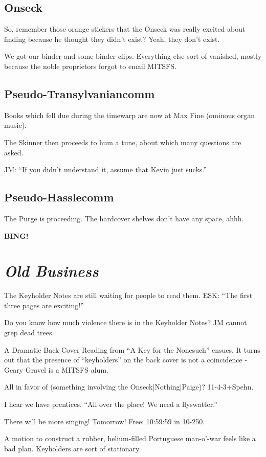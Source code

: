 \documentclass[10pt]{article}
\newcommand{\bing}{{\bf BING!} }
\newcommand{\goto}[1]{\bing \vskip 12pt \section*{{\em{#1}}}}
\begin{document}
\subsection*{Onseck}

So, remember those orange stickers that the Onseck was really excited about finding
because he thought they didn't exist?  Yeah, they don't exist. 

We got our binder and some binder clips.  Everything else sort of vanished, mostly
because the noble proprietors forgot to email MITSFS.

\subsection*{Pseudo-Transylvaniancomm}

Books which fell due during the timewarp are now at Max Fine (ominous organ music).

The Skinner then proceeds to hum a tune, about which many questions are asked.

JM: ``If you didn't understand it, assume that Kevin just sucks.''

\subsection*{Pseudo-Hasslecomm}

The Purge is proceeding.  The hardcover shelves don't have any space, ahhh.

\goto{Old Business}

The Keyholder Notes are still waiting for people to read them.  ESK: ``The first three pages are
exciting!''

Do you know how much violence there is in the Keyholder Notes?  JM cannot grep dead trees.

A Dramatic Back Cover Reading from ``A Key for the Nonesuch'' ensues.  It turns out that the presence
of ``keyholders'' on the back cover is not a coincidence - Geary Gravel is a MITSFS alum. 

All in favor of (something involving the Onseck|Nothing|Paige)? 11-4-3+Spehn.

I hear we have prentices.  ``All over the place!  We need a flyswatter.''

There will be more singing!  Tomorrow!  Free: 10:59:59 in 10-250.

A motion to construct a rubber, helium-filled Portuguese man-o'-war feels like a bad plan.  Keyholders
are sort of stationary.
\end{document}

